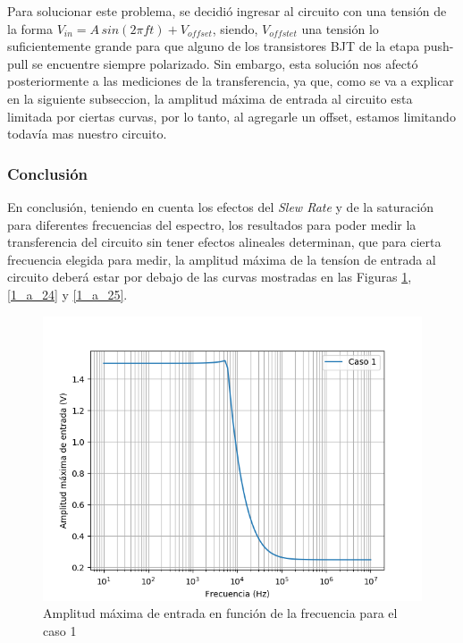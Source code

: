 Para solucionar este problema, se decidió ingresar al circuito con
una tensión de la forma $V_{in}=A\,sin(2\pi ft)+V_{offset}$, siendo,
$V_{offstet}$ una tensión lo suficientemente grande para que alguno
de los transistores BJT de la etapa push-pull se encuentre siempre
polarizado. Sin embargo, esta solución nos afectó posteriormente a
las mediciones de la transferencia, ya que, como se va a explicar
en la siguiente subseccion, la amplitud máxima de entrada al circuito
esta limitada por ciertas curvas, por lo tanto, al agregarle un offset,
estamos limitando todavía mas nuestro circuito.

\subsubsection{Conclusión}

En conclusión, teniendo en cuenta los efectos del \emph{Slew Rate}
y de la saturación para diferentes frecuencias del espectro, los resultados
para poder medir la transferencia del circuito sin tener efectos alineales
determinan, que para cierta frecuencia elegida para medir, la amplitud
máxima de la tensíon de entrada al circuito deberá estar por debajo
de las curvas mostradas en las Figuras \ref{1_a_21}, \ref{1_a_24}
y \ref{1_a_25}.

\begin{figure}[H]
\begin{centering}
\includegraphics[scale=0.5]{../Ex1/iA/Resources1a/AmplMaxVsFreq1}
\par\end{centering}
\caption{Amplitud máxima de entrada en función de la frecuencia para el caso
1}
\label{1_a_21}

\end{figure}

